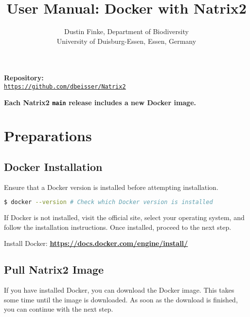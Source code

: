 \documentclass[a4paper,11pt]{article}
\title{User Manual: Docker with Natrix2}
\author{Dustin Finke, Department of Biodiversity \\ University of Duisburg-Essen, Essen, Germany}
\date{}
\newcommand{\vsp}{\vspace{0.2cm}}
\begin{document}
\maketitle

\vspace{-0.7cm}
\begin{center}
    \textbf{\fontsize{11}{12}\selectfont Repository:}\\[0.3em]
    \uline{\href{https://github.com/dbeisser/Natrix2}{\texttt{https://github.com/dbeisser/Natrix2}}}
\end{center}

\vspace{-0.1cm}
\begin{center}
    \textbf{\fontsize{11}{12}\selectfont Each Natrix2 \texttt{main} release includes a new Docker image.}
\end{center}

\tableofcontents

\newpage

\section{Preparations}

\subsection{Docker Installation}
 
\noindent
Ensure that a Docker version is installed before attempting installation.

\begin{lstlisting}[language=bash]
$ docker --version # Check which Docker version is installed
\end{lstlisting}
\vsp

\noindent
If Docker is not installed, visit the official site, select your operating system, and follow the installation instructions. Once installed, proceed to the next step.
 \vsp
 
 \noindent
 Install Docker:
 \textbf{\uline{\href{https://docs.docker.com/engine/install/}{https://docs.docker.com/engine/install/}}}

\subsection{Pull Natrix2 Image}

\noindent
If you have installed Docker, you can download the Docker image. This takes some time until the image is downloaded. As soon as the download is finished, you can continue with the next step.
\end{document}
